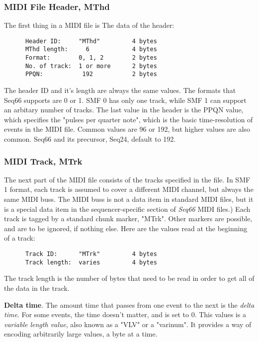 \subsubsection{MIDI File Header, MThd}
\label{subsubsec:midi_format_header}

   The first thing in a MIDI file is The data of the header:

   \begin{verbatim}
      Header ID:     "MThd"         4 bytes
      MThd length:     6            4 bytes
      Format:        0, 1, 2        2 bytes
      No. of track:  1 or more      2 bytes
      PPQN:           192           2 bytes
   \end{verbatim}

   The header ID and it's length are always the same values.  The formats that
   Seq66 supports are 0 or 1.  SMF 0 has only one track, while SMF 1 can
   support an arbitary number of tracks.  The last value in the header is the
   PPQN value, which specifies the "pulses per quarter note", which is the
   basic time-resolution of events in the MIDI file.  Common values are 96 or
   192, but higher values are also common.  Seq66 and its precursor,
   Seq24, default to 192.

\subsubsection{MIDI Track, MTrk}
\label{subsubsec:midi_format_track}

   The next part of the MIDI file consists of the tracks specified in the file.
   In SMF 1 format, each track is assumed to cover a different MIDI channel,
   but always the same MIDI buss.
   The MIDI buss is not a data item in standard MIDI files,
   but it is a special data item in the sequencer-specific
   section of \textsl{Seq66} MIDI files.)  Each track is tagged by
   a standard chunk marker, "MTrk".  Other markers are possible, and are to be
   ignored, if nothing else.  Here are the values read at the beginning of a
   track:

   \begin{verbatim}
      Track ID:      "MTrk"         4 bytes
      Track length:  varies         4 bytes
   \end{verbatim}

   The track length is the number of bytes that need to be read in order to get
   all of the data in the track.

   \textbf{Delta time}.
   The amount time that passes from one event to the next is the
   \textsl{delta time}.
   For some events, the time doesn't matter, and is set to 0.
   This values is a
   \textsl{variable length value}, also known as a "VLV" or a "varinum".   It
   provides a way of encoding arbitrarily large values, a byte at a time.

